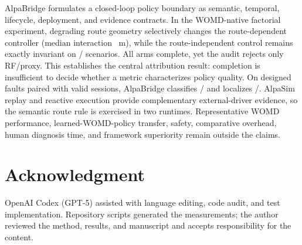 \documentclass[a4paper,10pt,conference]{ieeeconf}
\begin{document}
AlpaBridge formulates a closed-loop policy boundary as semantic, temporal, lifecycle,
deployment, and evidence contracts. In the WOMD-native factorial experiment, degrading
route geometry selectively changes the route-dependent controller (median interaction
\CVMWaymaxInteractionMedianM{}~m), while the route-independent control remains exactly
invariant on \CVMWaymaxNegativeControlInvariant{}/\CVMWaymaxEligibleScenarios{}
scenarios. All arms complete, yet the audit rejects only RF/proxy. This establishes the
central attribution result: completion is insufficient to decide whether a metric
characterizes policy quality. On \CVMDiagnosticFaultCases{} designed faults paired with
\CVMDiagnosticControlCases{} valid sessions, AlpaBridge classifies
\CVMWODDiagnosticCorrect{}/\CVMDiagnosticCases{} and localizes
\CVMWODDiagnosticLocalized{}/\CVMDiagnosticFaultCases{}. AlpaSim replay and reactive
execution provide complementary external-driver evidence, so the semantic route rule
is exercised in two runtimes. Representative WOMD performance, learned-WOMD-policy
transfer, safety, comparative overhead, human diagnosis time, and framework superiority
remain outside the claims.

\section*{Acknowledgment}

OpenAI Codex (GPT-5) assisted with language editing, code audit, and test
implementation. Repository scripts generated the measurements; the author reviewed the
method, results, and manuscript and accepts responsibility for the content.



\end{document}
